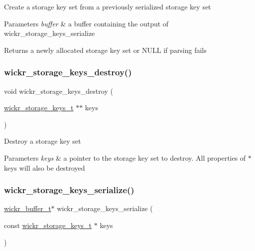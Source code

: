 Create a storage key set from a previously serialized storage key set


\begin{DoxyParams}{Parameters}
{\em buffer} & a buffer containing the output of \textquotesingle{}wickr\+\_\+storage\+\_\+keys\+\_\+serialize\textquotesingle{} \\
\hline
\end{DoxyParams}
\begin{DoxyReturn}{Returns}
a newly allocated storage key set or N\+U\+LL if parsing fails 
\end{DoxyReturn}
\mbox{\label{group__wickr__storage__keys_ga2c1494802577d025d70bf553c43da344}} 
\subsubsection{\texorpdfstring{wickr\+\_\+storage\+\_\+keys\+\_\+destroy()}{wickr\_storage\_keys\_destroy()}}
{\footnotesize\ttfamily void wickr\+\_\+storage\+\_\+keys\+\_\+destroy (\begin{DoxyParamCaption}\item[{\hyperlink{structwickr__storage__keys}{wickr\+\_\+storage\+\_\+keys\+\_\+t} $\ast$$\ast$}]{keys }\end{DoxyParamCaption})}

Destroy a storage key set


\begin{DoxyParams}{Parameters}
{\em keys} & a pointer to the storage key set to destroy. All properties of \textquotesingle{}$\ast$keys\textquotesingle{} will also be destroyed \\
\hline
\end{DoxyParams}
\mbox{\label{group__wickr__storage__keys_ga10a0d6e13442682b2fecff2ed753c2f6}} 
\subsubsection{\texorpdfstring{wickr\+\_\+storage\+\_\+keys\+\_\+serialize()}{wickr\_storage\_keys\_serialize()}}
{\footnotesize\ttfamily \hyperlink{structwickr__buffer}{wickr\+\_\+buffer\+\_\+t}$\ast$ wickr\+\_\+storage\+\_\+keys\+\_\+serialize (\begin{DoxyParamCaption}\item[{const \hyperlink{structwickr__storage__keys}{wickr\+\_\+storage\+\_\+keys\+\_\+t} $\ast$}]{keys }\end{DoxyParamCaption})}

